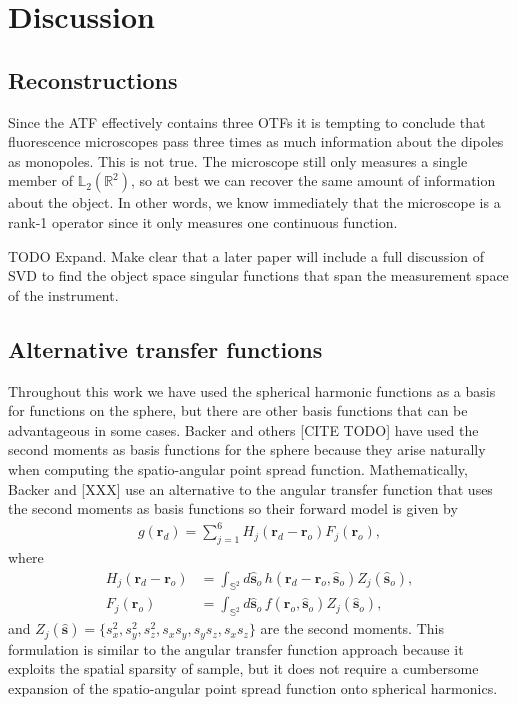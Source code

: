 \documentclass[]{osa-article}
\providecommand{\ro}{\mathbf{\mathbf{r}}_o}
\providecommand{\so}{\mathbf{\hat{s}}_o}
\providecommand{\rd}{\mathbf{r}_d}
\providecommand{\mh}[1]{\mathbf{\hat{#1}}}
\providecommand{\mbb}[1]{\mathbb{#1}}
\begin{document}
 
\section{Discussion}\label{sec:discussion}
\subsection{Reconstructions}
Since the ATF effectively contains three OTFs it is tempting to conclude that
fluorescence microscopes pass three times as much information about the dipoles
as monopoles. This is not true. The microscope still only measures a single
member of $\mbb{L}_2(\mbb{R}^2)$, so at best we can recover the same amount of
information about the object. In other words, we know immediately that the
microscope is a rank-1 operator since it only measures one continuous function.

TODO Expand. Make clear that a later paper will include a full discussion of SVD
to find the object space singular functions that span the measurement space of
the instrument.

\subsection{Alternative transfer functions}
Throughout this work we have used the spherical harmonic functions as a basis
for functions on the sphere, but there are other basis functions that can be
advantageous in some cases. Backer and others [CITE TODO] have used the second
moments as basis functions for the sphere because they arise naturally when
computing the spatio-angular point spread function. Mathematically, Backer and
[XXX] use an alternative to the angular transfer function that uses the second
moments as basis functions so their forward model is given by
\begin{align}
  g(\rd) = \sum_{j=1}^6 H_j(\rd - \ro)F_j(\ro),
\end{align}
where
\begin{align}
  H_j(\rd - \ro) &= \int_{\mbb{S}^2}d\so\, h(\rd - \ro, \so)Z_j(\so),\\
  F_j(\ro) &= \int_{\mbb{S}^2}d\so\, f(\ro, \so)Z_j(\so),
\end{align}
and $Z_j(\mh{s}) = \{s_x^2, s_y^2, s_z^2, s_xs_y, s_ys_z, s_xs_z\}$ are the
second moments. This formulation is similar to the angular transfer function
approach because it exploits the spatial sparsity of sample, but it does not
require a cumbersome expansion of the spatio-angular point spread function onto
spherical harmonics.
\end{document}

